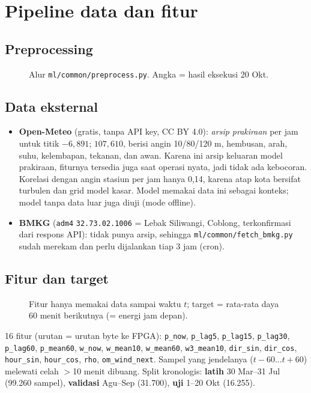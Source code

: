 \documentclass[10.5pt,a4paper]{article}
\newcommand{\diagram}[1]{}
\newcommand{\cmd}[1]{\texttt{#1}}
\begin{document}
\section{Pipeline data dan fitur}
\subsection{Preprocessing}
\begin{figure}[h]
\centering\resizebox{\linewidth}{!}{\diagram{pipeline}}
\caption{Alur \cmd{ml/common/preprocess.py}. Angka = hasil eksekusi 20 Okt.}
\end{figure}

\subsection{Data eksternal}
\begin{itemize}
  \item \textbf{Open-Meteo} (gratis, tanpa API key, CC BY 4.0): \emph{arsip prakiraan} per jam untuk titik $-6{,}891$; $107{,}610$, berisi angin
        10/80/120 m, hembusan, arah, suhu, kelembapan, tekanan, dan awan. Karena ini arsip keluaran model prakiraan, fiturnya tersedia juga saat operasi nyata,
        jadi tidak ada kebocoran. Korelasi dengan angin stasiun per jam hanya 0,14, karena atap kota bersifat turbulen dan grid model kasar.
        Model memakai data ini sebagai konteks; model tanpa data luar juga diuji (mode offline).
  \item \textbf{BMKG} (\cmd{adm4} \cmd{32.73.02.1006} = Lebak Siliwangi, Coblong, terkonfirmasi dari respons API): tidak punya arsip, sehingga
        \cmd{ml/common/fetch\_bmkg.py} sudah merekam dan perlu dijalankan tiap 3 jam (cron).
\end{itemize}

\subsection{Fitur dan target}
\begin{figure}[h]
\centering\resizebox{0.9\linewidth}{!}{\diagram{jendela}}
\caption{Fitur hanya memakai data sampai waktu $t$; target = rata-rata daya 60 menit berikutnya (= energi jam depan).}
\end{figure}
16 fitur (urutan = urutan byte ke FPGA): \cmd{p\_now}, \cmd{p\_lag5}, \cmd{p\_lag15}, \cmd{p\_lag30}, \cmd{p\_lag60}, \cmd{p\_mean60},
\cmd{w\_now}, \cmd{w\_mean10}, \cmd{w\_mean60}, \cmd{w3\_mean10}, \cmd{dir\_sin}, \cmd{dir\_cos}, \cmd{hour\_sin}, \cmd{hour\_cos}, \cmd{rho}, \cmd{om\_wind\_next}.
Sampel yang jendelanya ($t-60\ldots t+60$) melewati celah $>$10 menit dibuang. Split kronologis:
\textbf{latih} 30 Mar--31 Jul (99.260 sampel), \textbf{validasi} Agu--Sep (31.700), \textbf{uji} 1--20 Okt (16.255).
\end{document}
